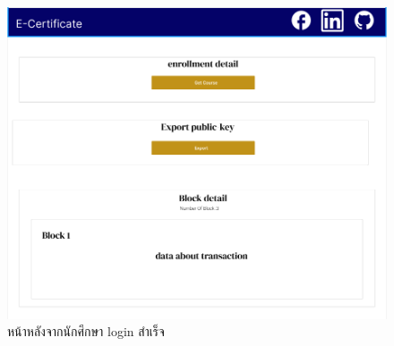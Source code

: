 \graphicspath{ {./images/} }
\begin{figure}[htbp]
  \centering 
  \includegraphics[scale=0.5]{st.png}
  \caption[Peers Diagram 5]{หน้าหลังจากนักศึกษา login สำเร็จ}
  \label{fig:student}
\end{figure}
  

